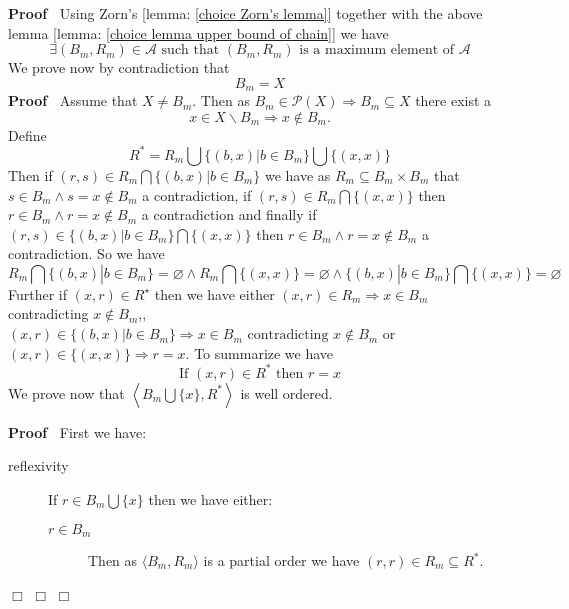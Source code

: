 \documentclass{book}
\newcommand{\nin}{\not\in}
\newenvironment{proof}{\noindent\textbf{Proof\ }}{\hspace*{\fill}$\Box$\medskip}
\begin{document}
\begin{proof}
  Using Zorn's [lemma: \ref{choice Zorn's lemma}] together with the above
  lemma [lemma: \ref{choice lemma upper bound of chain}] we have
  \begin{equation}
    \label{eq 3.68.019} \exists (B_m, R_m) \in \mathcal{A} \text{ such that }
    (B_m, R_m) \text{ is a maximum element of $\mathcal{A}$}
  \end{equation}
  We prove now by contradiction that
  \[ B_m = X \]
  \begin{proof}
    Assume that $X \neq B_m$. Then as $B_m \in \mathcal{P} (X) \Rightarrow B_m
    \subseteq X$ there exist a
    \[ x \in X\backslash B_m \Rightarrow x \nin B_m . \]
    Define
    \begin{equation}
      \label{eq 3.69.019} R^{\ast} = R_m \bigcup \{ (b, x) |b \in B_m \}
      \bigcup \{ (x, x) \}
    \end{equation}
    Then if $(r, s) \in R_m \bigcap \{ (b, x) |b \in B_m \}$ we have as $R_m
    \subseteq B_m \times B_m$ that $s \in B_m \wedge s = x \nin B_m$ a
    contradiction, if $(r, s) \in R_m \bigcap \{ (x, x) \}$ then $r \in B_m
    \wedge r = x \nin B_m$ a contradiction and finally if $(r, s) \in \{ (b,
    x) |b \in B_m \} \bigcap \{ (x, x) \}$ then $r \in B_m \wedge r = x \nin
    B_m$ a contradiction. So we have
    \begin{equation}
      \label{eq 3.70.019} R_m \bigcap \{ (b, x) |b \in B_m \} = \varnothing
      \wedge R_m \bigcap \{ (x, x) \} = \varnothing \wedge \{ (b, x) |b \in
      B_m \} \bigcap \{ (x, x) \} = \varnothing
    \end{equation}
    Further if $ (x, r) \in R^{\star}$ then we have either $(x, r) \in R_m
    \Rightarrow x \in B_m$ contradicting $x \nin B_m$,, $(x, r) \in \{ (b, x)
    |b \in B_m \} \Rightarrow x \in B_m \text{ contradicting } x \nin B_m$ or
    $(x, r) \in \{ (x, x) \} \Rightarrow r = x$. To summarize we have
    \begin{equation}
      \label{eq 3.71.019} \text{If } (x, r) \in R^{\ast} \text{ then } r = x
    \end{equation}
    We prove now that $\left\langle B_m \bigcup \{ x \}, R^{\ast}
    \right\rangle \text{}$ is well ordered.
    
    \begin{proof}
      First we have:
      \begin{description}
        \item[reflexivity] If $r \in B_m \bigcup \{ x \}$ then we have either:
        \begin{description}
          \item[$r \in B_m$] Then as $\langle B_m, R_m \rangle$ is a partial
          order we have $(r, r) \in R_m \subseteq R^{\ast}$.
          

\end{description}
\end{description}
\end{proof}
\end{proof}
\end{proof}
\end{document}
